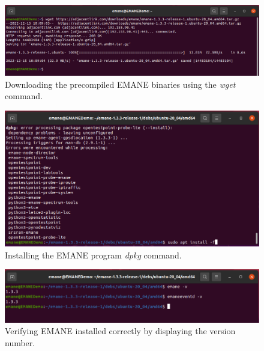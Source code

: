 \begin{figure}[!ht]
    \centering
    \includegraphics[width=\textwidth,keepaspectratio]{Images/Chpt2/wgetEMANE.png}
    \caption{Downloading the precompiled EMANE binaries using the \textit{wget} command.}
    \label{wget_emane}
\end{figure}

\begin{figure}[!ht]
    \centering
    \includegraphics[width=\textwidth,keepaspectratio]{Images/Chpt2/dpkgEMANE.png}
    \caption{Installing the EMANE program \textit{dpkg} command.}
    \label{install_emane}
\end{figure}

\begin{figure}[!ht]
    \centering
    \includegraphics[width=\textwidth,keepaspectratio]{Images/Chpt2/versionEMANE.png}
    \caption{Verifying EMANE installed correctly by displaying the version number.}
    \label{check_emane}
\end{figure}

